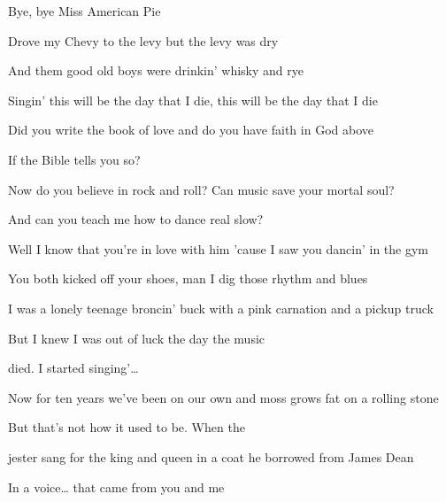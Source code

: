 \begin{song}
\bigskip

\begin{chorusbox}{\Chorus}
Bye, bye Miss American Pie \par
Drove my Chevy to the levy but the levy was dry \par
And them good old boys were drinkin' whisky and rye \par
Singin' this will be the day that I die, this will be the day that I die \par
\end{chorusbox}

\bigskip

 \par
{} Did you write the book of love and do you have faith in God above \par
{} If the Bible tells you so? \par
Now do you believe in rock and roll? Can music save your mortal soul? \par
And  can you teach me  how to dance real slow? \par

\bigskip

Well I know that you're in love with him 'cause I saw you dancin' in the gym \par
You both kicked off your shoes, man I dig those rhythm and blues \par
I was a lonely teenage broncin' buck with a pink carnation and a pickup truck \par
But I knew I was out of luck the day the music \par
{}died.   I started singing'… \par

\bigskip

\Chorus \par

\bigskip

Now for ten years we've been on our own and moss grows fat on a rolling stone \par
But that's not how it used to be. When the \par
{}jester sang for the king and queen in a coat he borrowed from James Dean \par
In a voice… that came from you and me \par


\end{song}
